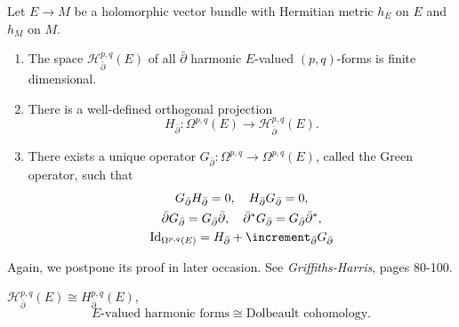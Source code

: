 \documentclass[12pt]{article}
\begin{document}
\begin{theorem}
  Let \(E\to M\) be a holomorphic vector bundle with Hermitian metric \(h_E\) on \(E\)
  and \(h_M\) on \(M\).
  \begin{enumerate}[(1)]
  \item The space \(\mathcal{H}_{\bar{\partial}}^{p,q}(E)\) of all \(\bar{\partial}\)
    harmonic \(E\)-valued \((p,q)\)-forms is finite dimensional.
  \item There is a well-defined orthogonal projection \[
      H_{\bar{\partial}}\colon \Omega^{p,q}(E)\longrightarrow
      \mathcal{H}_{\bar{\partial}}^{p,q}(E)
    .\]
  \item There exists a unique operator \(G_{\bar{\partial}}\colon
    \Omega^{p,q}\to \Omega^{p,q}(E)\), called the Green operator, such that
    \begin{gather*}
      G_{\bar{\partial}}H_{\bar{\partial}}=0,\quad
      H_{\bar{\partial}}G_{\bar{\partial}}=0, \\ 
      \bar{\partial}G_{\bar{\partial}}=G_{\bar{\partial}}\bar{\partial},\quad
      \bar{\partial}^*G_{\bar{\partial}}=G_{\bar{\partial}}\bar{\partial}^*, \\
      \op{Id}_{\Omega^{p,q}(E)}=H_{\bar{\partial}}
      +\lap_{\bar{\partial}}G_{\bar{\partial}}
    \end{gather*}
  \end{enumerate}
\end{theorem}
Again, we postpone its proof in later occasion. See \emph{Griffiths-Harris}, pages
80-100.

\begin{corollary}
  \(\mathcal{H}_{\bar{\partial}}^{p,q}(E)\cong H_{\bar{\partial}}^{p,q}(E)\), \ie\ \[
    E\text{-valued harmonic forms}\cong \text{Dolbeault cohomology}
  .\] 
\end{corollary}
\end{document}
